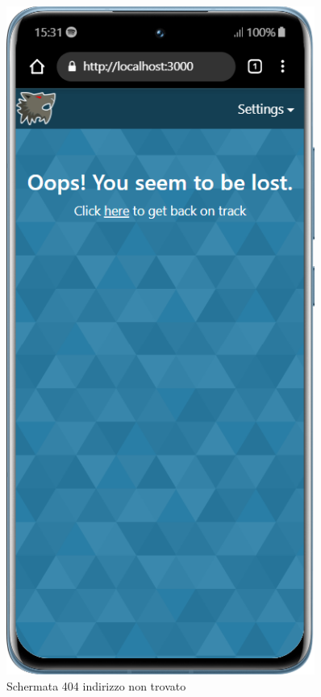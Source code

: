 \begin{figure}[H]
\begin{minipage}{0.45\textwidth}
        \label{fig:stats_mobile}
    \end{minipage}\hfill
    \begin{minipage}{0.45\textwidth}
        \centering
        \includegraphics[width=0.9\textwidth]{img/screen/mobile/404_mobile.png}
        \caption{Schermata 404 indirizzo non trovato}
        \label{fig:404_mobile}
    \end{minipage}
\end{figure}


